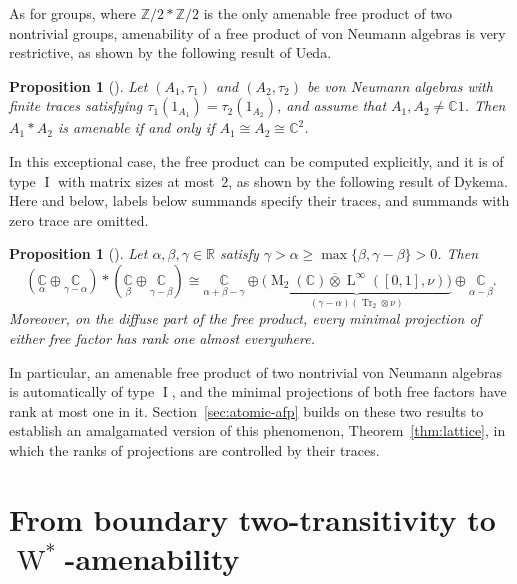 \documentclass[11pt]{amsart}
\numberwithin{equation}{section}
\newcommand{\zz}{\mathbb Z}
\newcommand{\rr}{\mathbb R}
\newcommand{\cc}{\mathbb C}
\newcommand{\pt}{\otimes}
\newcommand{\ovt}{\mathbin{\overline{\otimes}}}
\DeclareMathOperator{\I}{I}
\DeclareMathOperator{\Tr}{Tr}
\newcommand{\Wstar}{\operatorname{W}^*}
\newcommand{\rL}{\operatorname{L}}
\newcommand{\rM}{\operatorname{M}}
\newtheorem{Prop}[The]{Proposition}
\theoremstyle{definition}
\begin{document}
As for groups, where $\zz/2\ast\zz/2$ is the only amenable free product of two nontrivial groups, amenability of a free product of von Neumann algebras is very restrictive, as shown by the following result of Ueda.

\begin{Prop}[{\cite[Remarks~4.2(5)]{Ue11}}]
    \label{prop:scalar-amenability}
    Let $(A_1,\tau_1)$ and $(A_2,\tau_2)$ be von Neumann algebras with finite traces satisfying $\tau_1(1_{A_1})=\tau_2(1_{A_2})$, and assume that $A_1,A_2\neq\cc1$. Then $A_1\ast A_2$ is amenable if and only if $A_1\cong A_2\cong\cc^2$.
\end{Prop}


In this exceptional case, the free product can be computed explicitly, and it is of type $\I$ with matrix sizes at most~$2$, as shown by the following result of Dykema.
Here and below, labels below summands specify their traces, and summands with zero trace are omitted.

\begin{samepage}
\begin{Prop}[{\cite[Theorem~1.1]{Dy93}}]
    \label{prop:two-projections}
    Let $\alpha,\beta,\gamma\in\rr$ satisfy $\gamma>\alpha\geq\max\{\beta,\gamma-\beta\}>0$. Then
    $$
        \left(\underset{\alpha}{\cc}\oplus\underset{\gamma-\alpha}{\cc}\right)
        \ast\left(\underset{\beta}{\cc}\oplus\underset{\gamma-\beta}{\cc}\right)
        \cong\underset{\alpha+\beta-\gamma}{\cc}
        \oplus\underbrace{\bigl(\rM_2(\cc)\ovt\rL^\infty([0,1],\nu)\bigr)}_{(\gamma-\alpha)(\Tr_2\pt\nu)}
        \oplus\underset{\alpha-\beta}{\cc}.
    $$
    Moreover, on the diffuse part of the free product, every minimal projection of either free factor has rank one almost everywhere.
\end{Prop}
\end{samepage}


In particular, an amenable free product of two nontrivial von Neumann algebras is automatically of type $\I$, and the minimal projections of both free factors have rank at most one in it. Section~\ref{sec:atomic-afp} builds on these two results to establish an amalgamated version of this phenomenon, Theorem~\ref{thm:lattice}, in which the ranks of projections are controlled by their traces.


\section{From boundary two-transitivity to \texorpdfstring{$\Wstar$}{W*}-amenability}
\label{sec:wstar-amenability}
\end{document}
